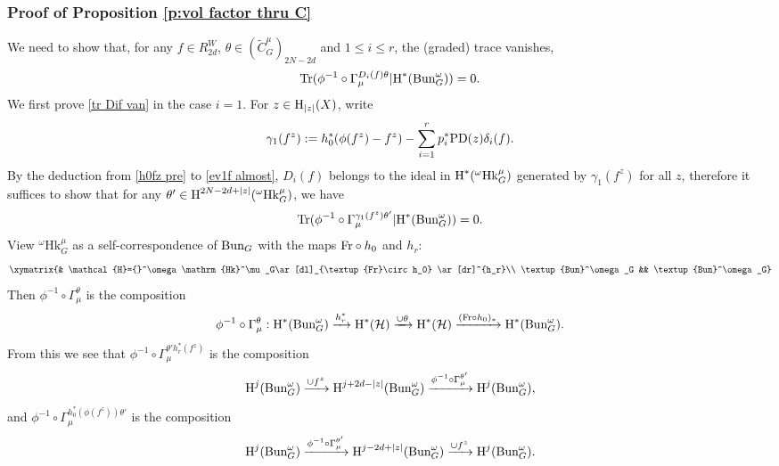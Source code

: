 \documentclass[reqno]{amsart}
\numberwithin{equation}{subsection}
\theoremstyle{definition}
\newcommand\cH{\mathcal{H}}
\newcommand{\Bun}{\textup{Bun}}
\newcommand\Fr{\textup{Fr}}
\newcommand\Hk{\mathrm{Hk}}
\newcommand{\Tr}{\textup{Tr}}
\newcommand{\wt}[1]{\widetilde{#1}}
\renewcommand\c\circ
\newcommand{\homog}[2]{\textup{H}_{#1}({#2})}  %
\newcommand{\cohog}[2]{\textup{H}^{#1}({#2})}     %
\newcommand\xr{\xrightarrow}
\newcommand\g\gamma
\newcommand\G\Gamma
\renewcommand\d\delta
\renewcommand{\th}{\theta}
\newcommand{\om}{\omega}
\newcommand\PD{\textup{PD}}
\begin{document}
\subsubsection{Proof of Proposition \ref{p:vol factor thru C}}
    We need to show that, for any $f\in R^W_{2d}$, $\th\in (\wt C^\mu_G)_{2N-2d}$ and $1\le i\le r$, the (graded) trace vanishes,
    \begin{equation}\label{tr Dif van}
        \Tr(\phi^{-1}\c\G^{D_i(f)\th}_\mu|\cohog{*}{\Bun^\om_G})=0.
    \end{equation}
    We first prove \eqref{tr Dif van} in the case $i=1$. For $z\in \homog{|z|}{X}$, write
    \begin{equation*}
        \g_1(f^z):=h_0^*(\phi(f^z)-f^z)-\sum_{i=1}^r p_i^*\PD(z)\d_i(f).
    \end{equation*}
    By the deduction from \eqref{h0fz pre} to \eqref{ev1f almost}, $D_i(f)$ belongs to the ideal in $\cohog{*}{{}^\om\Hk^\mu_G}$ generated by $\g_1(f^z)$ for all $z$, therefore it suffices to show that for any
    $\th'\in \cohog{2N-2d+|z|}{{}^\om\Hk^\mu_G}$, we have
    \begin{equation}\label{van tr gamma1}
        \Tr(\phi^{-1}\c\G^{\g_1(f^z)\th'}_\mu|\cohog{*}{\Bun^\om_G})=0.
    \end{equation}
    View ${}^\om\Hk^\mu_G$ as a self-correspondence of $\Bun_G$ with the maps $\Fr\c h_0$ and $h_r$:
    \begin{equation*}
        \xymatrix{& \cH={}^\om\Hk^\mu_G\ar[dl]_{\Fr\c h_0} \ar[dr]^{h_r}\\
        \Bun^\om_G && \Bun^\om_G}
    \end{equation*}
    Then $\phi^{-1}\c\G^\th_\mu$ is the composition
    \begin{equation*}
        \phi^{-1}\c\G^\th_\mu: \cohog{*}{\Bun^\om_G}\xr{h_r^*}\cohog{*}{\cH}\xr{\cup\th}\cohog{*}{\cH}\xr{(\Fr\c h_0)_*}\cohog{*}{\Bun^\om_G}.
    \end{equation*}
    From this we see that $\phi^{-1}\c\G_\mu^{\th'h_r^*(f^z)}$ is the composition
    \begin{equation}\label{cup then Gamma}
        \cohog{j}{\Bun^\om_G}\xr{\cup f^z}\cohog{j+2d-|z|}{\Bun^\om_G}\xr{\phi^{-1}\c\G^{\th'}_\mu}\cohog{j}{\Bun^\om_G},
    \end{equation}
    and $\phi^{-1}\c \G_\mu^{h_0^*(\phi(f^z))\th'}$ is the composition
    \begin{equation}\label{Gamma then cup}
        \cohog{j}{\Bun^\om_G}\xr{\phi^{-1}\c\G^{\th'}_\mu}\cohog{j-2d+|z|}{\Bun^\om_G}\xr{\cup f^z}\cohog{j}{\Bun^\om_G}.
    \end{equation}
\end{document}
